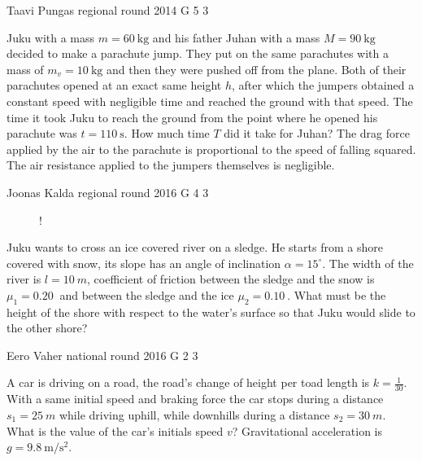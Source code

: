 \documentclass[11pt]{article}
\begin{document}
{Taavi Pungas} %
{regional round} %
{2014} %
{G 5} %
{3} %
{

\ifEngStatement
Juku with a mass $m=\SI{60}{\kg}$ and his father Juhan with a mass $M=\SI{90}{\kg}$ decided to make a parachute jump. They put on the same parachutes with a mass of $m_v=\SI{10}{\kg}$ and then they were pushed off from the plane. Both of their parachutes opened at an exact same height $h$, after which the jumpers obtained a constant speed with negligible time and reached the ground with that speed. The time it took Juku to reach the ground from the point where he opened his parachute was $t=\SI{110}{\s}$. How much time $T$ did it take for Juhan? The drag force applied by the air to the parachute is proportional to the speed of falling squared. The air resistance applied to the jumpers themselves is negligible.
\fi
}

{Joonas Kalda} %
{regional round} %
{2016} %
{G 4} %
{3} %
{

\ifEngStatement
\begin{figure}
	\vspace{-12pt}
	\begin{resizebox}{\linewidth}{!}{
	}
	\end{resizebox}
\end{figure}
Juku wants to cross an ice covered river on a sledge. He starts from a shore covered with snow, its slope has an angle of inclination $\alpha = 15^{\circ}$. The width of the river is $l = \SI{10}{m}$, coefficient of friction between the sledge and the snow is $\mu_1 = \SI{0.20}{}$ and between the sledge and the ice $\mu_2 = \SI{0.10}{}$. What must be the height of the shore with respect to the water’s surface so that Juku would slide to the other shore?
\fi
}

{Eero Vaher} %
{national round} %
{2016} %
{G 2} %
{3} %
{

\ifEngStatement
A car is driving on a road, the road’s change of height per toad length is $k=\frac{1}{30}$. With a same initial speed and braking force the car stops during a distance $s_1=\SI{25}{m}$ while driving uphill, while downhills during a distance $s_2=\SI{30}{m}$. What is the value of the car’s initials speed $v$? Gravitational acceleration is $g=\SI{9.8}{\meter\per\second\squared}$.
\fi
}
\end{document}
